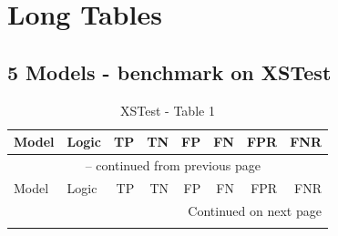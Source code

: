 \documentclass{article}
\begin{document}

\section{Long Tables}

\subsection{5 Models - benchmark on XSTest}

{\small
\begin{longtable}{llrrrrrr}
\caption{XSTest - Table 1} \label{tab:5models} \\
 
\toprule
Model & Logic & TP & TN & FP & FN & FPR & FNR \\
\midrule
\endfirsthead
 
\multicolumn{8}{c}{\tablename\ \thetable{} -- continued from previous page} \\
\toprule
Model & Logic & TP & TN & FP & FN & FPR & FNR \\
\midrule
\endhead
 
\midrule
\multicolumn{8}{r}{Continued on next page} \\
\endfoot
 
\bottomrule
\endlastfoot


\end{longtable}}
\end{document}
